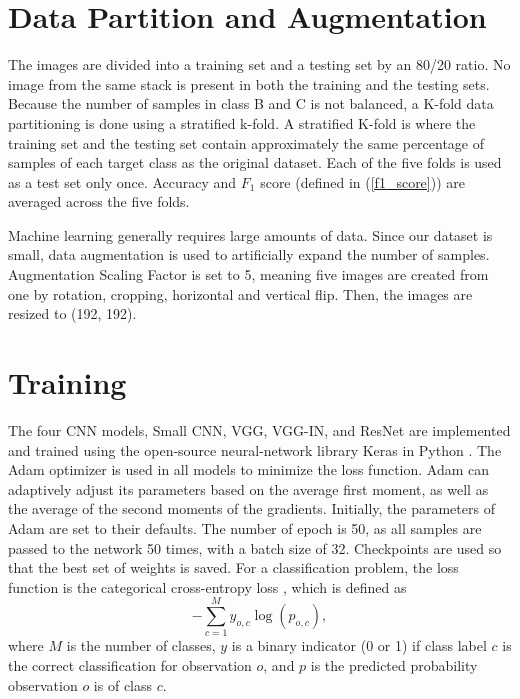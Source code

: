 \section{Data Partition and Augmentation}
\label{result_aug}

The images are divided into a training set and a testing set by an 80/20 ratio. No image from the same stack is present in both the training and the testing sets. Because the number of samples in class B and C is not balanced, a K-fold data partitioning is done using a stratified k-fold. A stratified K-fold is where the training set and the testing set contain approximately the same percentage of samples of each target class as the original dataset. Each of the five folds is used as a test set only once. Accuracy and $F_1$ score (defined in (\ref{f1_score})) are averaged across the five folds.

Machine learning generally requires large amounts of data. Since our dataset is small, data augmentation is used to artificially expand the number of samples. Augmentation Scaling Factor is set to 5, meaning five images are created from one by rotation, cropping, horizontal and vertical flip. Then, the images are resized to (192, 192).

\section{Training}
\label{result_training}

The four CNN models, Small CNN, VGG, VGG-IN, and ResNet are implemented and trained using the open-source neural-network library Keras \citep{chollet2015keras} in Python \citep{van1995python}. The Adam \citep{adam} optimizer is used in all models to minimize the loss function. Adam can adaptively adjust its parameters based on the average first moment, as well as the average of the second moments of the gradients. Initially, the parameters of Adam are set to their defaults. The number of epoch is 50, as all samples are passed to the network 50 times, with a batch size of 32. Checkpoints are used so that the best set of weights is saved. For a classification problem, the loss function is the categorical cross-entropy loss \citep{Goodfellow-et-al-2016}, which is defined as $$-\sum^M_{c=1} y_{o,c}\log(p_{o,c}),$$
where $M$ is the number of classes, $y$ is a binary indicator (0 or 1) if class label $c$ is the correct classification for observation $o$, and $p$ is the predicted probability observation $o$ is of class $c$. 

